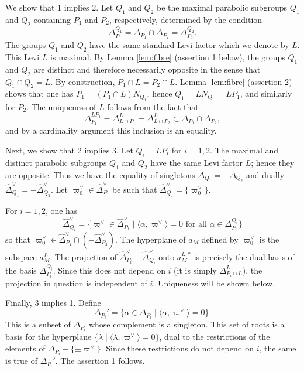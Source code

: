 \begin{paragr}
\begin{preuve}
  We show that 1 implies 2. Let $Q_1$ and $Q_2$ be the maximal parabolic subgroups $Q_1$ and $Q_2$ containing $P_1$ and $P_2$, respectively, determined by the condition 
$$\Delta_{P_1}^{Q_1}= \Delta_{P_1}\cap \Delta_{P_2}= \Delta_{P_2}^{Q_2}.$$
The groups $Q_1$ and $Q_2$ have the same standard Levi factor which we denote by $L$. This Levi $L$ is maximal. By Lemma \ref{lem:fibre} (assertion 1 below), the groups $Q_1$ and $Q_2$ are distinct and therefore necessarily opposite in the sense that $Q_1\cap Q_2=L$. By construction, $P_1\cap L=P_2\cap L$. Lemma \ref{lem:fibre} (assertion 2) shows that one has $P_1=(P_1\cap L) N_{Q_1}$, hence $Q_1=LN_{Q_1}=LP_1$, and similarly for $P_2$. The uniqueness of $L$ follows from the fact that
$$\Delta_{P_1}^{LP_1}=\Delta^L_{L\cap P_1}=\Delta^L_{L\cap P_2}\subset \Delta_{P_1}\cap \Delta_{P_2},$$
and by a cardinality argument this inclusion is an equality.

Next, we show that 2 implies 3. Let $Q_i=LP_i$ for $i=1,2$. The maximal and distinct parabolic subgroups $Q_1$ and $Q_2$ have the same Levi factor $L$; hence they are opposite. Thus we have the equality of singletons $\Delta_{Q_1}=-\Delta_{Q_2}$ and dually $\hat{\Delta}_{Q_1}^\vee=-\hat{\Delta}_{Q_2}^\vee$. Let $\varpi^\vee_0 \in \hat{\Delta}_{P_1}^\vee$ be such that  $\hat{\Delta}_{Q_1}^\vee=\{\varpi^\vee_0  \}$.

For $i=1,2$, one has
\begin{equation}
    \label{eq:deltaPi}\hat{\Delta}_{Q_i}^\vee= \{  \varpi^\vee \in \hat{\Delta}_{P_1}^\vee \mid   \langle \alpha,\varpi^\vee\rangle =0 \text{ for all } \alpha \in \Delta_{P_i}^{Q_i}\}
\end{equation}
so that $\varpi^\vee_0\in \hat{\Delta}^\vee_{P_1}\cap(-\hat{\Delta}^\vee_{P_2})$. The hyperplane of $a_M$ defined by  $\varpi^\vee_0$ is the subspace $a_M^L$. The projection of $\hat{\Delta}_{P_i}^\vee-\hat{\Delta}_{Q_i}^\vee$ onto $a_M^{L,*}$ is precisely the dual basis of the basis $\Delta_{P_i}^{Q_i}$. Since this does not depend on $i$ (it is simply $\Delta_{P_i\cap L}^L$), the projection in question is independent of $i$. Uniqueness will be shown below.

Finally, 3 implies 1. Define
$$\Delta_{P_i}'=\{\alpha \in \Delta_{P_i} \mid  \langle \alpha, \varpi^\vee\rangle=0 \}.$$
This is a subset of $\Delta_{P_i}$ whose complement is a singleton. This set of roots is a basis for the hyperplane $\{ \lambda \mid \langle \lambda, \varpi^\vee\rangle=0\}$, dual to the restrictions of the elements of $\hat{\Delta}_{P_i}-\{\pm\varpi^\vee\}$. Since these restrictions do not depend on $i$, the same is true of $\Delta_{P_i}'$. The assertion 1 follows.


\end{preuve}
\end{paragr}
